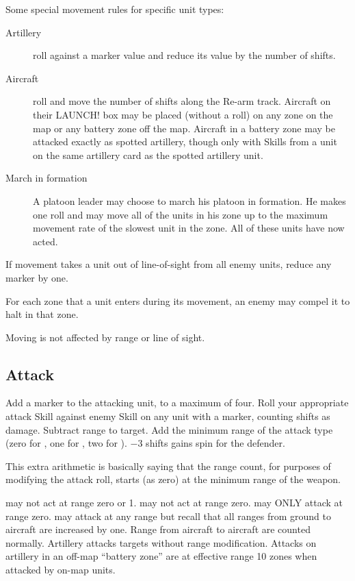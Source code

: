 Some special movement rules for specific unit types:

\begin{description}
\item [Artillery]
roll  against a \SPOTTED{} marker value and reduce its value by the number of shifts.

\item [Aircraft]
roll  and move the number of shifts along the Re-arm track. Aircraft on their LAUNCH! box may be placed (without a roll) on any zone on the map or any battery zone off the map. Aircraft in a battery zone may be attacked exactly as spotted artillery, though only with  Skills from a unit on the same artillery card as the spotted artillery unit.

\item[March in formation]
A platoon leader may choose to march his platoon in formation. He makes one  roll and may move all of the units in his zone up to the maximum movement rate of the slowest unit in the zone. All of these units have now acted.
\end{description}

If movement takes a unit out of line-of-sight from all enemy units, reduce any \SPOTTED{} marker by one.

For each zone that a unit enters during its movement, an enemy may compel it to halt in that zone.

Moving is not affected by range or line of sight.


\subsection{Attack}\label{sec:platoon-combat-attack}

Add a \SPOTTED{} marker to the attacking unit, to a maximum of four. Roll your appropriate attack Skill against enemy  Skill on any unit with a \SPOTTED{} marker, counting shifts as damage. Subtract range to target. Add the minimum range of the attack type (zero for , one for , two for ). $-3$ shifts gains spin for the defender.

This extra arithmetic is basically saying that the range count, for purposes of modifying the attack roll, starts (as zero) at the minimum range of the weapon.

 may not act at range zero or 1.  may not act at range zero.  may ONLY attack at range zero.  may attack at any range but recall that all ranges from ground to aircraft are increased by one. Range from aircraft to aircraft are counted normally. Artillery attacks targets without range modification. Attacks on artillery in an off-map ``battery zone'' are at effective range 10 zones when attacked by on-map units.

